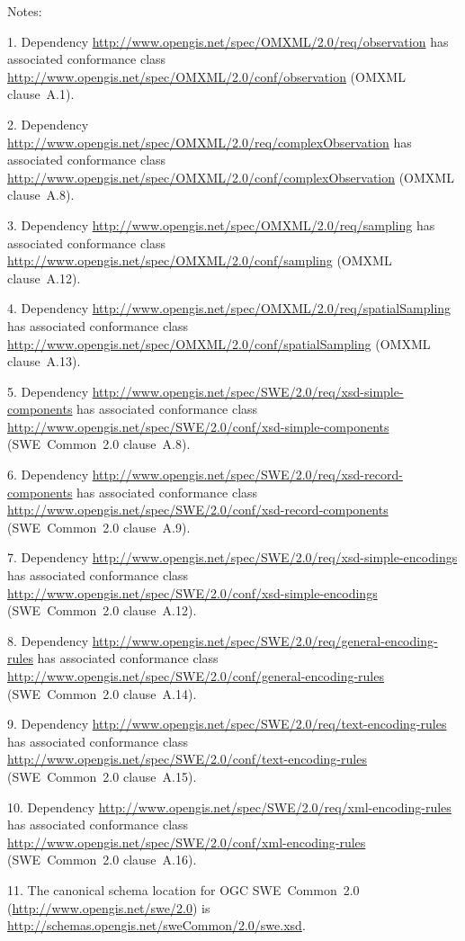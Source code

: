 Notes:

1. Dependency \url{http://www.opengis.net/spec/OMXML/2.0/req/observation} has associated conformance class \url{http://www.opengis.net/spec/OMXML/2.0/conf/observation} (OMXML clause~A.1).

2. Dependency \url{http://www.opengis.net/spec/OMXML/2.0/req/complexObservation} has associated conformance class \url{http://www.opengis.net/spec/OMXML/2.0/conf/complexObservation} (OMXML clause~A.8).

3. Dependency \url{http://www.opengis.net/spec/OMXML/2.0/req/sampling} has associated conformance class \url{http://www.opengis.net/spec/OMXML/2.0/conf/sampling} (OMXML clause~A.12).

4. Dependency \url{http://www.opengis.net/spec/OMXML/2.0/req/spatialSampling} has associated conformance class \url{http://www.opengis.net/spec/OMXML/2.0/conf/spatialSampling} (OMXML clause~A.13).

5. Dependency \url{http://www.opengis.net/spec/SWE/2.0/req/xsd-simple-components} has associated conformance class \url{http://www.opengis.net/spec/SWE/2.0/conf/xsd-simple-components} (SWE~Common~2.0 clause~A.8).

6. Dependency \url{http://www.opengis.net/spec/SWE/2.0/req/xsd-record-components} has associated conformance class \url{http://www.opengis.net/spec/SWE/2.0/conf/xsd-record-components} (SWE~Common~2.0 clause~A.9).

7. Dependency \url{http://www.opengis.net/spec/SWE/2.0/req/xsd-simple-encodings} has associated conformance class \url{http://www.opengis.net/spec/SWE/2.0/conf/xsd-simple-encodings} (SWE~Common~2.0 clause~A.12).

8. Dependency \url{http://www.opengis.net/spec/SWE/2.0/req/general-encoding-rules} has associated conformance class \url{http://www.opengis.net/spec/SWE/2.0/conf/general-encoding-rules} (SWE~Common~2.0 clause~A.14).

9. Dependency \url{http://www.opengis.net/spec/SWE/2.0/req/text-encoding-rules} has associated conformance class \url{http://www.opengis.net/spec/SWE/2.0/conf/text-encoding-rules} (SWE~Common~2.0 clause~A.15).

10. Dependency \url{http://www.opengis.net/spec/SWE/2.0/req/xml-encoding-rules} has associated conformance class \url{http://www.opengis.net/spec/SWE/2.0/conf/xml-encoding-rules} (SWE~Common~2.0 clause~A.16).

11. The canonical schema location for OGC SWE~Common~2.0 (\url{http://www.opengis.net/swe/2.0}) is \url{http://schemas.opengis.net/sweCommon/2.0/swe.xsd}.

